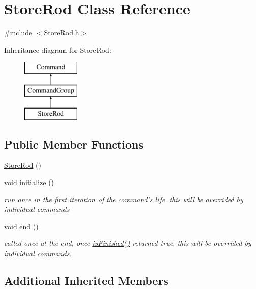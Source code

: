 \hypertarget{classStoreRod}{\section{Store\-Rod Class Reference}
\label{classStoreRod}
}


{\ttfamily \#include $<$Store\-Rod.\-h$>$}

Inheritance diagram for Store\-Rod\-:\begin{figure}[H]
\begin{center}
\leavevmode
\includegraphics[height=3.000000cm]{classStoreRod}
\end{center}
\end{figure}
\subsection*{Public Member Functions}
\begin{DoxyCompactItemize}
\item 
\hyperlink{classStoreRod_aa93884f16d225969adecca7efc75d900}{Store\-Rod} ()
\item 
void \hyperlink{classStoreRod_adc7dcbbc465900aebefe4b990e88f74a}{initialize} ()
\begin{DoxyCompactList}\small\item\em run once in the first iteration of the command's life. this will be overrided by individual commands \end{DoxyCompactList}\item 
void \hyperlink{classStoreRod_a2fe691b28cb7c6942242caa35e43eecb}{end} ()
\begin{DoxyCompactList}\small\item\em called once at the end, once \hyperlink{classCommandGroup_a96807a2763adf9e21ebf2cb9e3574e3c}{is\-Finished()} returned true. this will be overrided by individual commands. \end{DoxyCompactList}\end{DoxyCompactItemize}
\subsection*{Additional Inherited Members}


